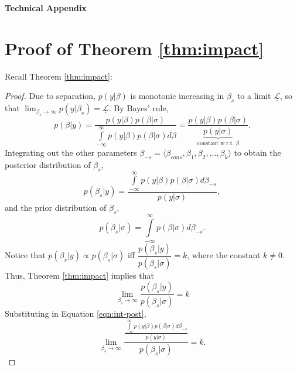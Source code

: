\documentclass[12pt]{article}
\begin{document}
\clearpage
\doublespace
\begin{appendix}
\begin{center}
\LARGE{\textbf{Technical Appendix}}\vspace{4mm}
\end{center}

\section*{Proof of Theorem \ref{thm:impact}}

Recall Theorem \ref{thm:impact}:

\impact*

\begin{proof}
Due to separation, $p(y|\beta)$ is monotonic increasing in $\beta_s$ to a limit $\underline{\mathscr{L}}$, so that $\displaystyle \lim_{\beta_s \to \infty} p(y | \beta_s) = \underline{\mathscr{L}}$. By Bayes' rule, 
\begin{equation*}
p(\beta | y) = \dfrac{p(y | \beta)p(\beta | \sigma)}{\int\limits_{-\infty}^{\infty}p(y | \beta)p(\beta | \sigma)d\beta} = \dfrac{p(y | \beta)p(\beta | \sigma)}{\underbrace{p(y | \sigma)}_{\text{constant w.r.t. }\beta}}. 
\end{equation*}
Integrating out the other parameters $\beta_{-s} = \langle \beta_{cons}, \beta_1, \beta_2, ..., \beta_k \rangle$ to obtain the posterior distribution of $\beta_s$, 
\begin{equation}\label{eqn:int-post}
p(\beta_s | y) = \dfrac{\int\limits_{-\infty}^{\infty}p(y | \beta)p(\beta | \sigma)d\beta_{-s}}{p(y | \sigma)}, 
\end{equation}
and the prior distribution of $\beta_s$, 
\begin{equation*}
p(\beta_s | \sigma) = \int\limits_{-\infty}^{\infty}p(\beta | \sigma)d\beta_{-s}.
\end{equation*}
Notice that $p(\beta_s | y) \propto p(\beta_s | \sigma)$ iff $\dfrac{p(\beta_s | y)}{p(\beta_s | \sigma)} = k$, where the constant $k \neq 0$. Thus, Theorem \ref{thm:impact} implies that
\begin{equation*}
\lim _{\beta_s \to \infty} \dfrac{p(\beta_s | y)}{p(\beta_s | \sigma)} = k
\end{equation*}
Substituting in Equation \ref{eqn:int-post},
\begin{equation*}
\lim _{\beta_s \to \infty} \dfrac{\frac{\int\limits_{-\infty}^{\infty}p(y | \beta)p(\beta | \sigma)d\beta_{-s}}{p(y | \sigma)}}{p(\beta_s | \sigma)} = k.
\end{equation*}

\end{proof}
\end{appendix}
\end{document}
